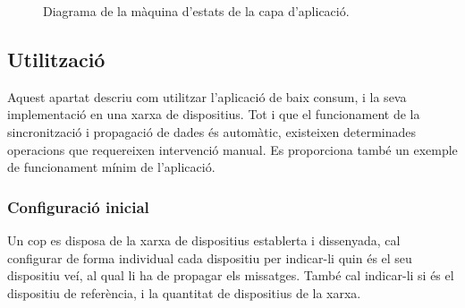 \documentclass{tfgitic}[2024/07/01]
\begin{document}
{\begin{figure}
    \caption{Diagrama de la màquina d'estats de la capa d'aplicació.}
    \label{fig:app_maquina_estats}
\end{figure}

\subsection{Utilització}
Aquest apartat descriu com utilitzar l'aplicació de baix consum, i la seva implementació en una xarxa de dispositius. Tot i que el funcionament de la sincronització i propagació de dades és automàtic, existeixen determinades operacions que requereixen intervenció manual. Es proporciona també un exemple de funcionament mínim de l'aplicació.

\subsubsection{Configuració inicial}
Un cop es disposa de la xarxa de dispositius establerta i dissenyada, cal configurar de forma individual cada dispositiu per indicar-li quin és el seu dispositiu veí, al qual li ha de propagar els missatges. També cal indicar-li si és el dispositiu de referència, i la quantitat de dispositius de la xarxa.

}
\end{document}
